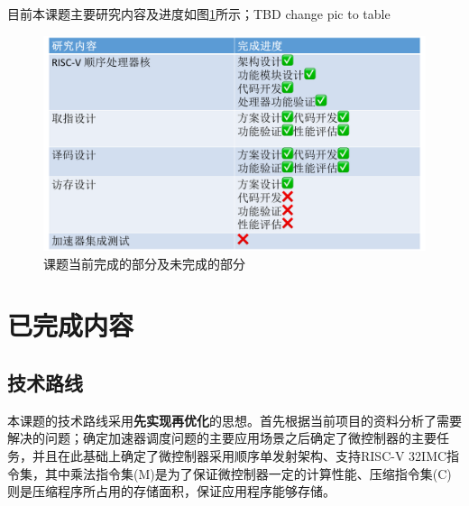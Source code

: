 \documentclass[a4paper, 12pt]{article}
\begin{document}
目前本课题主要研究内容及进度如图\ref{fig:study_progress}所示；TBD change pic to table

\begin{figure}[htbp]
  \centering
  \includegraphics[width=\linewidth]{./images/study_progress.pdf}
  \caption{课题当前完成的部分及未完成的部分}
  \label{fig:study_progress}
\end{figure}




\newpage
\section{已完成内容}%
\subsection{技术路线}%
本课题的技术路线采用\textbf{先实现再优化}的思想。首先根据当前项目的资料分析了需要解决的问题；确定加速器调度问题的主要应用场景之后确定了微控制器的主要任务，并且在此基础上确定了微控制器采用顺序单发射架构、支持RISC-V 32IMC指令集，其中乘法指令集(M)是为了保证微控制器一定的计算性能、压缩指令集(C)则是压缩程序所占用的存储面积，保证应用程序能够存储。
\end{document}
